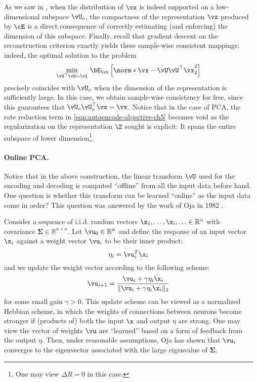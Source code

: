 \documentclass[../../book-main.tex]{subfiles}
\begin{document}
As we saw in , when the distribution of $\vx$ is indeed
supported on a low-dimensional subspace $\vU_o$, the compactness of
the representation
$\vz$ produced by $\cE$ is a direct consequence of correctly
estimating (and enforcing) the dimension of this subspace.  Finally,
recall that gradient descent on the reconstruction criterion exactly
yields these sample-wise consistent mappings: indeed, the optimal
solution to the problem
\begin{equation}\label{eq:pca-reconstruction-ch5}
  \min_{\vU^\top \vU = \vI}\, \bE_{\vx}\left[\norm*{\vx
  - \vU\vU^\top \vx}_2^2\right]
\end{equation}
precisely coincides with $\vU_o$ when the dimension of the representation is
sufficiently large. In this case, we obtain sample-wise consistency
for free, since this guarantees that $\vU_o\vU_o^\top \vx = \vx$.
Notice that in the case of PCA, the rate reduction term in
\eqref{eqn:autoencode-objective-ch5} becomes void as the regularization
on the representation $\Z$ sought is explicit: It spans the entire
subspace of lower dimension\footnote{One may view $\Delta R = 0$ in this case.}.

\paragraph{Online PCA.} Notice that in the above construction, the
linear transform $\vU$
used for the encoding and decoding is computed ``offline'' from all
the input data before hand. One question is whether this transform
can be learned ``online'' as the input data come in order? This
question was answered by the work of Oja in 1982 \cite{Oja1982SimplifiedNM}.
\begin{example} Consider a
  sequence of i.i.d. random vectors $\x_1, \ldots, \x_i, \ldots \in
  \mathbb{R}^n$ with covariance $\boldsymbol{\Sigma} \in
  \mathbb{R}^{n\times n}$. Let $\vu_0 \in \mathbb{R}^n$ and define
  the response of an input vector $\x_i$ against a weight vector
  $\vu_i$ to be their inner product:
  \begin{equation}
    \eta_i = \vu_i^T \x_i
  \end{equation}
  and we update the weight vector according to the following scheme:
  \begin{equation}
    \vu_{i+1} = \frac{\vu_i + \gamma \eta_i \x_i}{\|\vu_i + \gamma
    \eta_i \x_i\|_2}
    \label{eqn:Hebbian}
  \end{equation}
  for some small gain $\gamma >0$. This update scheme can be viewed
  as a normalized Hebbian scheme, in which the weights of connections
  between neurons become stronger if (products of) both the input
  $\x$ and output $\eta$ are strong. One may view the vector of
  weights $\vu$ are ``learned'' based on a form of feedback from the
  output $\eta$.
  Then, under reasonable assumptions, Oja \cite{Oja1982SimplifiedNM} has 
  shown that $\vu_i$ converges to the eigenvector associated with
  the large eigenvalue of $\boldsymbol{\Sigma}$.
\end{example}
\end{document}
